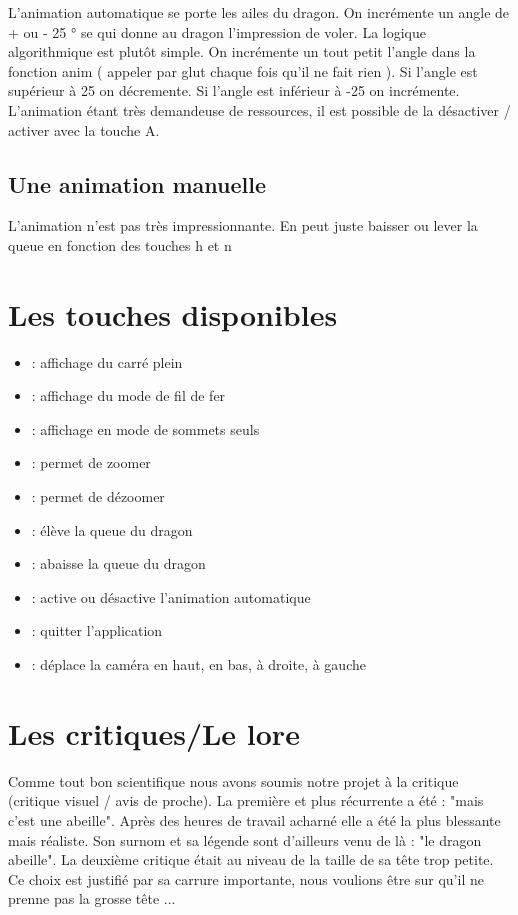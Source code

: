\documentclass{article}
\begin{document}
L'animation automatique se porte les ailes du dragon. On incrémente un angle de + ou - 25 ° se qui donne au dragon l'impression de voler. La logique algorithmique est plutôt simple. On incrémente un tout petit l'angle dans la fonction anim ( appeler par glut chaque fois qu'il ne fait rien ). Si l'angle est supérieur à 25 on décremente. Si l'angle est inférieur à -25 on incrémente. 
\newline
\newline
L'animation étant très demandeuse de ressources, il est possible de la désactiver / activer avec la touche A.
\subsection{Une animation manuelle}

L'animation n'est pas très impressionnante. En peut juste baisser ou lever la queue en fonction des touches h et n


\section{Les touches disponibles}

\begin{itemize}
\item {} : affichage du carré plein
\item {} : affichage du mode de fil de fer
\item {} : affichage en mode de sommets seuls
\item {} : permet de zoomer
\item {} : permet de dézoomer 
\item {} : élève la queue du dragon
\item {} : abaisse la queue du dragon
\item {} : active ou désactive l'animation automatique 
\item {} : quitter l'application 
\item \UArrow \DArrow \LArrow \RArrow : déplace la caméra en haut, en bas, à droite, à gauche
\end{itemize}


\section{Les critiques/Le lore}

Comme tout bon scientifique nous avons soumis notre projet à la critique (critique visuel / avis de proche). La première et plus récurrente a été : "mais c'est une abeille". Après des heures de travail acharné elle a été la plus blessante mais réaliste. Son surnom et sa légende sont d'ailleurs venu de là : "le dragon abeille". La deuxième critique était au niveau de la taille de sa tête trop petite. Ce choix est justifié par sa carrure importante, nous voulions être sur qu'il ne prenne pas la grosse tête ... 

\end{document}
